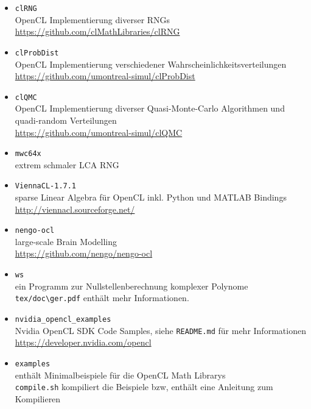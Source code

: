 \documentclass[headsepline=3pt,headinclude=true,12pt,oneside]{scrartcl}
\let\li=\lstinline
\begin{document}
\begin{itemize}
\begin{itemize}
			\item \li`clRNG` \\    
			OpenCL Implementierung diverser RNGs \\
			\url{https://github.com/clMathLibraries/clRNG}
			
			\item \li`clProbDist` \\
			OpenCL Implementierung verschiedener Wahrscheinlichkeitsverteilungen \\
			\url{https://github.com/umontreal-simul/clProbDist}			
			
			\item \li`clQMC` \\  
			OpenCL Implementierung diverser Quasi-Monte-Carlo Algorithmen und quadi-random Verteilungen \\
			\url{https://github.com/umontreal-simul/clQMC} 
			
			\item \li`mwc64x` \\    
			extrem schmaler LCA RNG
\newpage			
			\item \li`ViennaCL-1.7.1` \\
			sparse Linear Algebra für OpenCL inkl. Python und MATLAB Bindings \\
			\url{http://viennacl.sourceforge.net/}
					
			\item \li`nengo-ocl` \\ 
			large-scale Brain Modelling \\
			\url{https://github.com/nengo/nengo-ocl}
			
			\item \li`ws` \\
			ein Programm zur Nullstellenberechnung komplexer Polynome
			\li`tex/doc\ger.pdf` enthält mehr Informationen.
			
			\item \li`nvidia_opencl_examples` \\
			Nvidia OpenCL SDK Code Samples, siehe \li`README.md` für mehr Informationen \\
			\url{https://developer.nvidia.com/opencl}
						
			\item \li`examples` \\
			enthält Minimalbeispiele für die OpenCL Math Librarys \\
			\li`compile.sh` kompiliert die Beispiele bzw, enthält eine Anleitung zum Kompilieren
			

\end{itemize}
\end{itemize}
\end{document}
